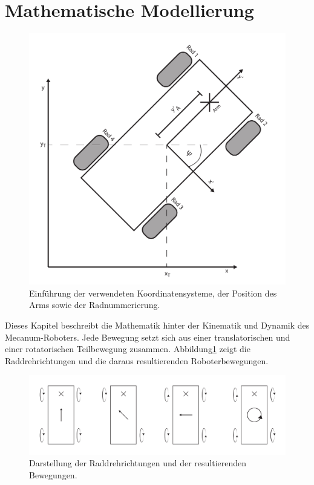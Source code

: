 

\section{Mathematische Modellierung}
\label{sec:Mathematische Modellierung}
\begin{figure}
    \centering
    \includegraphics[width=.8\textwidth]{Abbildungen/Koordinaten}
    \caption{Einführung der verwendeten Koordinatensysteme, der Position des Arms sowie der Radnummerierung.}
\end{figure}
Dieses Kapitel beschreibt die Mathematik hinter der Kinematik und Dynamik des Mecanum-Roboters.
Jede Bewegung setzt sich aus einer translatorischen und einer rotatorischen Teilbewegung zusammen. Abbildung\ref{fig:Drehrichtung} zeigt die Raddrehrichtungen und die daraus resultierenden Roboterbewegungen.

\begin{figure}[H]
    \centering
    \includegraphics[width=.8\textwidth]{Abbildungen/Drehrichtung}
    \caption{Darstellung der Raddrehrichtungen und der resultierenden Bewegungen.}
    \label{fig:Drehrichtung}
\end{figure}


